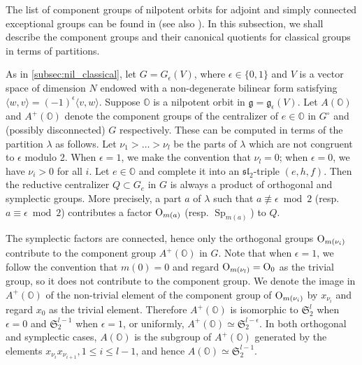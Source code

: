\documentclass[11pt, a4paper]{amsart}
\newcommand{\orb}{\mathbb{O}}
\newcommand{\fg}{\mathfrak{g}}
\newcommand{\fS}{\mathfrak{S}}
\newcommand{\Sp}{\operatorname{Sp}}
\newcommand{\slf}{\mathfrak{sl}}
\theoremstyle{definition}
\numberwithin{equation}{section}
\begin{document}
The list of component groups of nilpotent orbits for adjoint and simply connected exceptional groups can be found in \cite{Alexeevski} (see also \cite[Section 8.4]{CM}). In this subsection, we shall describe the component groups and their canonical quotients for classical groups in terms of partitions.

As in \cref{subsec:nil_classical}, let $G = G_\epsilon(V)$, where $\epsilon\in \{ 0,1\}$ and $V$ is a vector space of dimension $N$ endowed with a non-degenerate bilinear form satisfying $\langle w,v\rangle = (-1)^\epsilon \langle v,w\rangle$. Suppose $\orb$ is a nilpotent orbit in $\fg=\fg_\epsilon(V)$.
Let $A(\orb)$ and $A^+(\orb)$ denote the component groups of the centralizer of $e\in\orb$ in $G^\circ$ and (possibly disconnected) $G$ respectively. These can be computed in terms of the partition $\lambda$ as follows. Let $\nu_1>\ldots > \nu_l$ be the parts of $\lambda$ which are not congruent to $\epsilon$ modulo 2. When $\epsilon = 1$, we make the convention that $\nu_l=0$; when $\epsilon = 0$, we have $\nu_i>0$ for all $i$.
Let $e \in\orb$ and complete it into an $\slf_2$-triple $(e,h,f)$. Then the reductive centralizer $Q \subset G_e$ in $G$ is always a product of orthogonal and symplectic groups. More precisely, a part $a$ of $\lambda$ such that $a \not\equiv \epsilon \bmod 2$ (resp. $a \equiv \epsilon\bmod 2$) contributes a factor ${\rm O}_{m(a)}$ (resp. $\Sp_{m(a)}$) to $Q$.

The symplectic factors are connected, hence only the orthogonal groups ${\rm O}_{m(\nu_i)}$ contribute to the component group $A^+(\orb)$ in $G$. Note that when $\epsilon = 1$, we follow the convention that $m(0) = 0$ and regard ${\rm O}_{m(\nu_l)} = {\rm O}_{0}$ as the trivial group, so it does not contribute to the component group. We denote the image in $A^+(\orb)$ of the non-trivial element of the component group of ${\rm O}_{m(\nu_i)}$ by $x_{\nu_i}$ and regard $x_{0}$ as the trivial element. Therefore $A^+(\orb)$ is isomorphic to $\fS_2^l$ when $\epsilon = 0$ and $\fS_2^{l-1}$ when $\epsilon = 1$, or uniformly, $A^+(\orb) \simeq \fS_2^{l-\epsilon}$.
In both orthogonal and symplectic cases, $A(\orb)$ is the subgroup of $A^+(\orb)$ generated by the elements $x_{\nu_i}x_{\nu_{i+1}}, 1\leqslant i \leqslant l-1$, and hence $A(\orb) \simeq \fS_2^{l-1}$.




\end{document}
